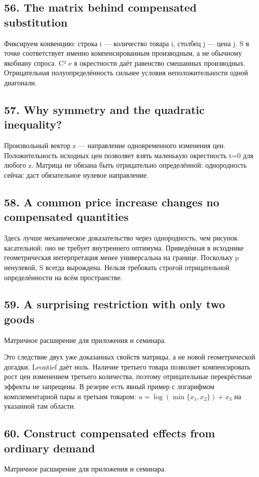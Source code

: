 \documentclass[11pt,a4paper]{article}
\begin{document}
\subsection*{56. The matrix behind compensated substitution}
Фиксируем конвенцию: строка i — количество товара i, столбец j — цена j. S в точке соответствует именно компенсированным производным, а не обычному якобиану спроса. C² e в окрестности даёт равенство смешанных производных. Отрицательная полуопределённость сильнее условия неположительности одной диагонали.

\subsection*{57. Why symmetry and the quadratic inequality?}
Произвольный вектор z — направление одновременного изменения цен. Положительность исходных цен позволяет взять маленькую окрестность t=0 для любого z. Матрица не обязана быть отрицательно определённой: однородность сейчас даст обязательное нулевое направление.

\subsection*{58. A common price increase changes no compensated quantities}
Здесь лучше механическое доказательство через однородность, чем рисунок касательной: оно не требует внутреннего оптимума. Приведённая в исходнике геометрическая интерпретация менее универсальна на границе. Поскольку p ненулевой, S всегда вырождена. Нельзя требовать строгой отрицательной определённости на всём пространстве.

\subsection*{59. A surprising restriction with only two goods}
Матричное расширение для приложения и семинара.

Это следствие двух уже доказанных свойств матрицы, а не новой геометрической догадки. Leontief даёт ноль. Наличие третьего товара позволяет компенсировать рост цен изменением третьего количества, поэтому отрицательные перекрёстные эффекты не запрещены. В резерве есть явный пример с логарифмом комплементарной пары и третьим товаром: $u=\log(\min\{x_1,x_2\})+x_3$ на указанной там области.

\subsection*{60. Construct compensated effects from ordinary demand}
Матричное расширение для приложения и семинара.
\end{document}
